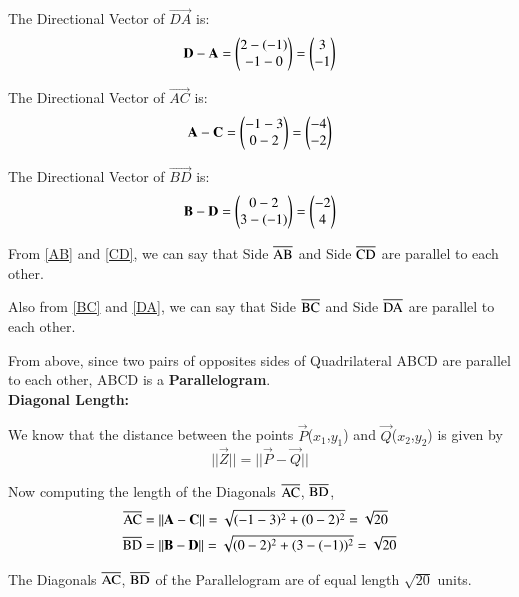 \documentclass[journal,12pt,twocolumn]{IEEEtran}
\begin{document}
The Directional Vector of $\vec{DA}$ is:
\begin{equation}
    \vec{D} - \vec{A} = \myvec{2-(-1)\\-1-0} = \myvec{3\\-1}
    \label{DA}
\end{equation}

The Directional Vector of $\vec{AC}$ is:
\begin{equation}
    \vec{A} - \vec{C} = \myvec{-1-3\\0-2} = \myvec{-4\\-2}
    \label{AC}
\end{equation}

The Directional Vector of $\vec{BD}$ is:
\begin{equation}
    \vec{B} - \vec{D} = \myvec{0-2\\3-(-1)} = \myvec{-2\\4}
    \label{BD}
\end{equation}

From \eqref{AB} and \eqref{CD}, we can say that Side $\overline{\rm AB}$ and Side $\overline{\rm CD}$ are parallel to each other.

Also from \eqref{BC} and \eqref{DA}, we can say that Side $\overline{\rm BC}$ and Side $\overline{\rm DA}$ are parallel to each other.

From above, since two pairs of opposites sides of Quadrilateral ABCD are parallel to each other, ABCD is a \textbf{Parallelogram}. \\

\textbf{Diagonal Length:}

We know that the distance between the points $\vec{P}$($x_1$,$y_1$) and $\vec{Q}$($x_2$,$y_2$) is given by
\begin{equation}
||\vec{Z}|| = ||\vec{P} - \vec{Q}||
\end{equation}

Now computing the length of the Diagonals $\overline{\rm AC}$, $\overline{\rm BD}$,
\begin{align}
    \overline{\rm AC} &= ||\vec{A} - \vec{C}|| = \sqrt{(-1-3)^2 + (0-2)^2} = \sqrt{20}\\
    \overline{\rm BD} &= ||\vec{B} - \vec{D}|| = \sqrt{(0-2)^2 + (3-(-1))^2} = \sqrt{20}
\end{align}

The Diagonals $\overline{\rm AC}$, $\overline{\rm BD}$ of the Parallelogram are of equal length $\sqrt{20}$ units.\\
\end{document}
